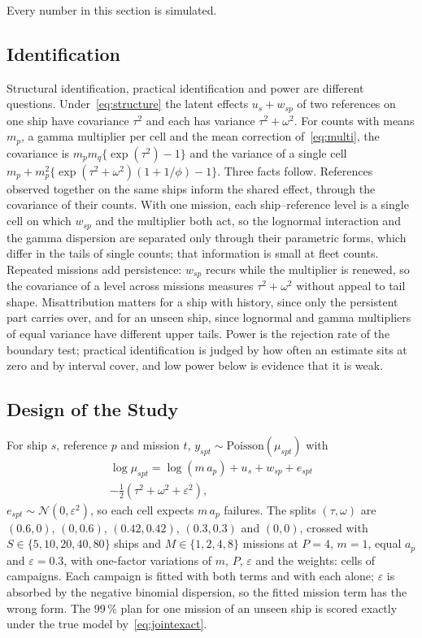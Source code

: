 Every number in this section is simulated.
\subsection{Identification}
Structural identification, practical identification and power are different
questions. Under~\eqref{eq:structure} the latent effects $u_s+w_{sp}$ of two
references on one ship have covariance $\tau^2$ and each has variance
$\tau^2+\omega^2$. For counts with means $m_p$, a gamma multiplier per cell and
the mean correction of~\eqref{eq:multi}, the covariance is
$m_pm_q\{\exp(\tau^2)-1\}$ and the variance of a single cell
$m_p+m_p^2\{\exp(\tau^2+\omega^2)(1+1/\phi)-1\}$. Three facts follow.
References observed together on the same ships inform the shared effect,
through the covariance of their counts. With one mission, each
ship--reference level is a single cell on which $w_{sp}$ and the multiplier
both act, so the lognormal interaction and the gamma dispersion are separated
only through their parametric forms, which differ in the tails of single
counts; that information is small at fleet counts. Repeated missions add
persistence: $w_{sp}$ recurs while the multiplier is renewed, so the
covariance of a level across missions measures $\tau^2+\omega^2$ without
appeal to tail shape. Misattribution matters for a ship with history, since
only the persistent part carries over, and for an unseen ship, since lognormal
and gamma multipliers of equal variance have different upper tails. Power is
the rejection rate of the boundary test; practical identification is judged by
how often an estimate sits at zero and by interval cover, and low power below
is evidence that it is weak.

\subsection{Design of the Study}
For ship $s$, reference $p$ and mission $t$,
$y_{spt}\sim\mathrm{Poisson}(\mu_{spt})$ with
\begin{multline}
\log\mu_{spt}=\log(m\,a_p)+u_s+w_{sp}+e_{spt}\\
-\tfrac12(\tau^2+\omega^2+\varepsilon^2),
\label{eq:sim}
\end{multline}
$e_{spt}\sim\mathcal N(0,\varepsilon^2)$, so each cell expects $m\,a_p$
failures. The splits $(\tau,\omega)$ are $(0.6,0)$, $(0,0.6)$, $(0.42,0.42)$,
$(0.3,0.3)$ and $(0,0)$, crossed with $S\in\{5,10,20,40,80\}$ ships and
$M\in\{1,2,4,8\}$ missions at $P=4$, $m=1$, equal $a_p$ and
$\varepsilon=0.3$, with one-factor variations of $m$, $P$, $\varepsilon$ and
the weights: \dsCells{} cells of \cdReps{} campaigns. Each campaign is fitted
with both terms and with each alone; $\varepsilon$ is absorbed by the negative
binomial dispersion, so the fitted mission term has the wrong form. The 99\,\%
plan for one mission of an unseen ship is scored exactly under the true model
by~\eqref{eq:jointexact}.

